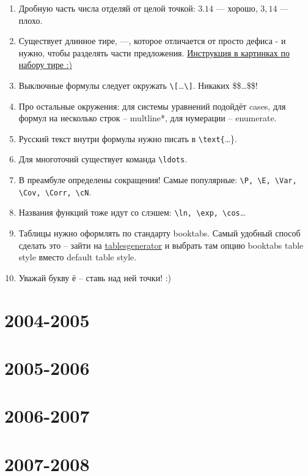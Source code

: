 \documentclass[12pt, a4paper]{article}\usepackage[]{graphicx}\usepackage[]{color}
\newcommand{\cN}{\mathcal{N}}
\begin{document}
\begin{enumerate}

\item Дробную часть числа отделяй от целой точкой: $3.14$ — хорошо, $3{,}14$ — плохо.
\item Существует длинное тире, —, которое отличается от просто дефиса - и нужно, чтобы разделять части предложения. \href{https://ru.wikihow.com/напечатать-тире}{Инструкция в картинках по набору тире :)}
\item Выключные формулы следует окружать \verb|\[|\ldots\verb|\]|. Никаких \$\$\ldots\$\$!
\item Про остальные окружения: для системы уравнений подойдёт cases, для формул на несколько строк – multline*, для нумерации – enumerate.
\item Русский текст внутри формулы нужно писать в \verb|\text{|\ldots\}.
\item Для многоточий существует команда \verb|\ldots|.
\item В преамбуле определены сокращения! Самые популярные: \verb|\P, \E, \Var, \Cov, \Corr, \cN|.
\item Названия функций тоже идут со слэшем: \verb|\ln, \exp, \cos|\ldots
\item Таблицы нужно оформлять по стандарту booktabs. Самый удобный способ сделать это – зайти на
\href{https://www.tablesgenerator.com}{tablesgenerator} и выбрать там опцию booktabs table style вместо default table style.
\item Уважай букву ё – ставь над ней точки! :)
\end{enumerate}


\section{2004-2005}



\section{2005-2006}



\section{2006-2007}



\section{2007-2008}
\end{document}
